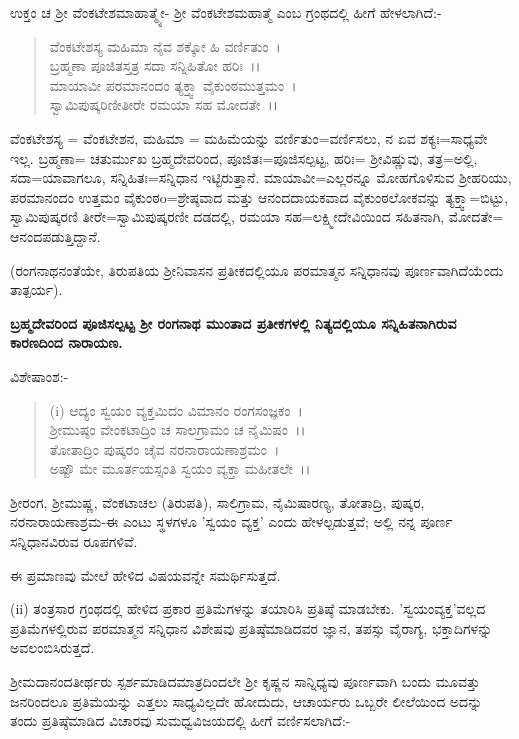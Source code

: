 ಉಕ್ತಂ ಚ ಶ‍್ರೀ ವೆಂಕಟೇಶಮಾಹಾತ್ಮ್ಯೇ- ಶ‍್ರೀ ವೆಂಕಟೇಶಮಹಾತ್ಮೆ ಎಂಬ ಗ್ರಂಥದಲ್ಲಿ ಹೀಗೆ ಹೇಳಲಾಗಿದೆ:-

\begin{verse}
ವೆಂಕಟೇಶಸ್ಯ ಮಹಿಮಾ ನೈವ ಶಕ್ಕೋ ಹಿ ವರ್ಣಿತುಂ~।\\ ಬ್ರಹ್ಮಣಾ ಪೂಜಿತಸ್ತತ್ರ ಸದಾ ಸನ್ನಿಹಿತೋ ಹರಿಃ~।।\\ ಮಾಯಾವೀ ಪರಮಾನಂದಂ ತ್ಯಕ್ತ್ವಾ ವೈಕುಂಠಮುತ್ತಮಂ~।\\ ಸ್ವಾಮಿಪುಷ್ಕರಿಣೀತೀರೇ ರಮಯಾ ಸಹ ಮೋದತೇ~।।
\end{verse}

ವೆಂಕಟೇಶಸ್ಯ = ವೆಂಕಟೇಶನ, ಮಹಿಮಾ = ಮಹಿಮೆಯನ್ನು ವರ್ಣಿತುಂ=ವರ್ಣಿಸಲು, ನ ಏವ ಶಕ್ಯಃ=ಸಾಧ್ಯವೇ ಇಲ್ಲ. ಬ್ರಹ್ಮಣಾ= ಚತುರ್ಮುಖ ಬ್ರಹ್ಮದೇವರಿಂದ, ಪೂಜಿತಃ=ಪೂಜಿಸಲ್ಪಟ್ಟ, ಹರಿಃ= ಶ‍್ರೀವಿಷ್ಣುವು, ತತ್ರ=ಅಲ್ಲಿ, ಸದಾ=ಯಾವಾಗಲೂ, ಸನ್ನಿಹಿತಃ=ಸನ್ನಿಧಾನ ಇಟ್ಟಿರುತ್ತಾನೆ. ಮಾಯಾವೀ=ಎಲ್ಲರನ್ನೂ ಮೋಹಗೊಳಿಸುವ ಶ‍್ರೀಹರಿಯು, ಪರಮಾನಂದಂ ಉತ್ತಮಂ ವೈಕುಂಠo=ಶ್ರೇಷ್ಠವಾದ ಮತ್ತು ಆನಂದದಾಯಕವಾದ ವೈಕುಂಠಲೋಕವನ್ನು ತ್ಯಕ್ತ್ವಾ=ಬಿಟ್ಟು, ಸ್ವಾಮಿಪುಷ್ಕರಣಿ ತೀರೇ=ಸ್ವಾಮಿಪುಷ್ಕರಣೀ ದಡದಲ್ಲಿ, ರಮಯಾ ಸಹ=ಲಕ್ಷ್ಮೀದೇವಿಯಿಂದ ಸಹಿತನಾಗಿ, ಮೋದತೇ= ಆನಂದಪಡುತ್ತಿದ್ದಾನೆ.

(ರಂಗನಾಥನಂತೆಯೇ, ತಿರುಪತಿಯ ಶ‍್ರೀನಿವಾಸನ ಪ್ರತೀಕದಲ್ಲಿಯೂ ಪರಮಾತ್ಮನ ಸನ್ನಿಧಾನವು ಪೂರ್ಣವಾಗಿದೆಯೆಂದು ತಾತ್ಪರ್ಯ).

\begin{center}
\textbf{ಬ್ರಹ್ಮದೇವರಿಂದ ಪೂಜಿಸಲ್ಪಟ್ಟ ಶ‍್ರೀ ರಂಗನಾಥ ಮುಂತಾದ ಪ್ರತೀಕಗಳಲ್ಲಿ ನಿತ್ಯದಲ್ಲಿಯೂ ಸನ್ನಿಹಿತನಾಗಿರುವ ಕಾರಣದಿಂದ ನಾರಾಯಣ.}
\end{center}

\noindent
ವಿಶೇಷಾಂಶ:-

\begin{verse}
(i) ಆದ್ಯಂ ಸ್ವಯಂ ವ್ಯಕ್ತಮಿದಂ ವಿಮಾನಂ ರಂಗಸಂಜ್ಞಕಂ~।\\ ಶ‍್ರೀಮುಷ್ಠಂ ವೇಂಕಟಾದ್ರಿಂ ಚ ಸಾಲಗ್ರಾಮಂ ಚ ನೈಮಿಷಂ~।।\\ ತೋತಾದ್ರಿಂ ಪುಷ್ಕರಂ ಚೈವ ನರನಾರಾಯಣಾಶ್ರಮಂ~।\\ ಅಷ್ಟೌ ಮೇ ಮೂರ್ತಯಸ್ಸಂತಿ ಸ್ವಯಂ ವ್ಯಕ್ತಾ ಮಹೀತಲೇ~।।
\end{verse}

ಶ‍್ರೀರಂಗ, ಶ‍್ರೀಮುಷ್ಣ, ವೆಂಕಟಾಚಲ (ತಿರುಪತಿ), ಸಾಲಿಗ್ರಾಮ, ನೈಮಿಷಾರಣ್ಯ, ತೋತಾದ್ರಿ, ಪುಷ್ಕರ, ನರನಾರಾಯಣಾಶ್ರಮ-ಈ ಎಂಟು ಸ್ಥಳಗಳೂ 'ಸ್ವಯಂ ವ್ಯಕ್ತ' ಎಂದು ಹೇಳಲ್ಪಡುತ್ತವೆ; ಅಲ್ಲಿ ನನ್ನ ಪೂರ್ಣ ಸನ್ನಿಧಾನವಿರುವ ರೂಪಗಳಿವೆ.

ಈ ಪ್ರಮಾಣವು ಮೇಲೆ ಹೇಳಿದ ವಿಷಯವನ್ನೇ ಸಮರ್ಥಿಸುತ್ತದೆ.

(ii) ತಂತ್ರಸಾರ ಗ್ರಂಥದಲ್ಲಿ ಹೇಳಿದ ಪ್ರಕಾರ ಪ್ರತಿಮೆಗಳನ್ನು ತಯಾರಿಸಿ ಪ್ರತಿಷ್ಠೆ ಮಾಡಬೇಕು. 'ಸ್ವಯಂವ್ಯಕ್ತ'ವಲ್ಲದ ಪ್ರತಿಮೆಗಳಲ್ಲಿರುವ ಪರಮಾತ್ಮನ ಸನ್ನಿಧಾನ ವಿಶೇಷವು ಪ್ರತಿಷ್ಠೆಮಾಡಿದವರ ಜ್ಞಾನ, ತಪಸ್ಸು ವೈರಾಗ್ಯ, ಭಕ್ತಾದಿಗಳನ್ನು ಅವಲಂಬಿಸಿರುತ್ತದೆ.

ಶ‍್ರೀಮದಾನಂದತೀರ್ಥರು ಸ್ಪರ್ಶಮಾಡಿದಮಾತ್ರದಿಂದಲೇ ಶ‍್ರೀ ಕೃಷ್ಣನ ಸಾನ್ನಿಧ್ಯವು ಪೂರ್ಣವಾಗಿ ಬಂದು ಮೂವತ್ತು ಜನರಿಂದಲೂ ಪ್ರತಿಮೆಯನ್ನು ಎತ್ತಲು ಸಾಧ್ಯವಿಲ್ಲದೇ ಹೋದುದು, ಆಚಾರ್ಯರು ಒಬ್ಬರೇ ಲೀಲೆಯಿಂದ ಅದನ್ನು ತಂದು ಪ್ರತಿಷ್ಠೆಮಾಡಿದ ವಿಚಾರವು ಸುಮಧ್ವವಿಜಯದಲ್ಲಿ ಹೀಗೆ ವರ್ಣಿಸಲಾಗಿದೆ:-


